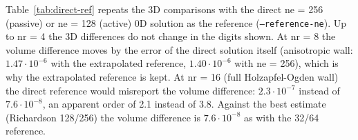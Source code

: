 Table~\ref{tab:direct-ref} repeats the 3D comparisons with the direct ne = 256 (passive) or
ne = 128 (active) 0D solution as the reference (\texttt{--reference-ne}). Up to nr = 4 the
3D differences do not change in the digits shown. At nr = 8 the volume difference moves
by the error of the direct solution itself (anisotropic wall: $1.47\cdot10^{-6}$ with the
extrapolated reference, $1.40\cdot10^{-6}$ with ne = 256), which is why the extrapolated
reference is kept. At nr = 16 (full Holzapfel-Ogden wall) the direct reference would
misreport the volume difference: $2.3\cdot10^{-7}$ instead of $7.6\cdot10^{-8}$, an apparent
order of 2.1 instead of 3.8. Against the best estimate (Richardson 128/256) the volume
difference is $7.6\cdot10^{-8}$ as with the 32/64 reference.
